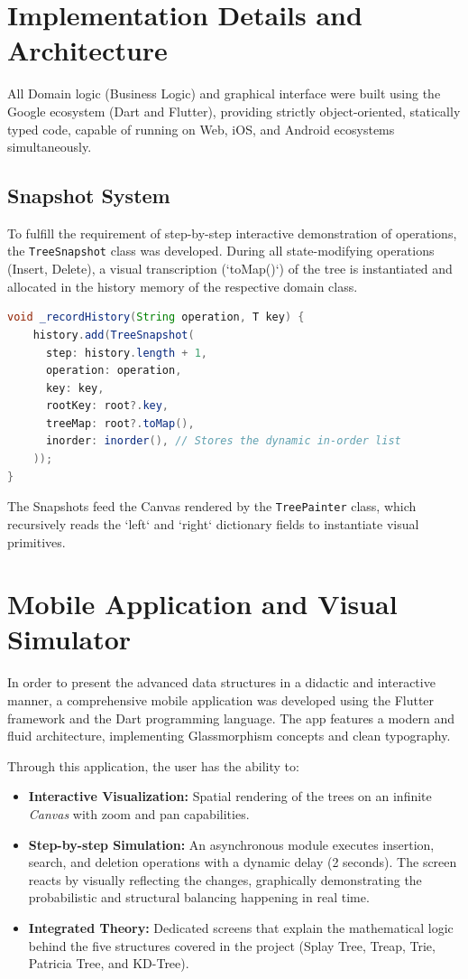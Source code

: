 \documentclass[12pt,a4paper]{article}
\begin{document}
\section{Implementation Details and Architecture}
All Domain logic (Business Logic) and graphical interface were built using the Google ecosystem (Dart and Flutter), providing strictly object-oriented, statically typed code, capable of running on Web, iOS, and Android ecosystems simultaneously.

\subsection{Snapshot System}
To fulfill the requirement of step-by-step interactive demonstration of operations, the \texttt{TreeSnapshot} class was developed. During all state-modifying operations (Insert, Delete), a visual transcription (`toMap()`) of the tree is instantiated and allocated in the history memory of the respective domain class.

\begin{lstlisting}[language=Java, caption=Capturing State in Snapshot during operations]
void _recordHistory(String operation, T key) {
    history.add(TreeSnapshot(
      step: history.length + 1,
      operation: operation,
      key: key,
      rootKey: root?.key,
      treeMap: root?.toMap(),
      inorder: inorder(), // Stores the dynamic in-order list
    ));
}
\end{lstlisting}

The Snapshots feed the Canvas rendered by the \texttt{TreePainter} class, which recursively reads the `left` and `right` dictionary fields to instantiate visual primitives.


\section{Mobile Application and Visual Simulator}
In order to present the advanced data structures in a didactic and interactive manner, a comprehensive mobile application was developed using the Flutter framework and the Dart programming language. The app features a modern and fluid architecture, implementing Glassmorphism concepts and clean typography.

Through this application, the user has the ability to:
\begin{itemize}
    \item \textbf{Interactive Visualization:} Spatial rendering of the trees on an infinite \textit{Canvas} with zoom and pan capabilities.
    \item \textbf{Step-by-step Simulation:} An asynchronous module executes insertion, search, and deletion operations with a dynamic delay (2 seconds). The screen reacts by visually reflecting the changes, graphically demonstrating the probabilistic and structural balancing happening in real time.
    \item \textbf{Integrated Theory:} Dedicated screens that explain the mathematical logic behind the five structures covered in the project (Splay Tree, Treap, Trie, Patricia Tree, and KD-Tree).
\end{itemize}
\end{document}
